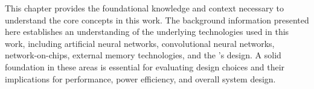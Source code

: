 This chapter provides the foundational knowledge and context necessary to understand the core concepts in this work.
The background information presented here establishes an understanding of the underlying technologies used in this work, including artificial neural networks, convolutional neural networks, network-on-chips, external memory technologies, and the \graicore{}'s design.
A solid foundation in these areas is essential for evaluating design choices and their implications for performance, power efficiency, and overall system design.